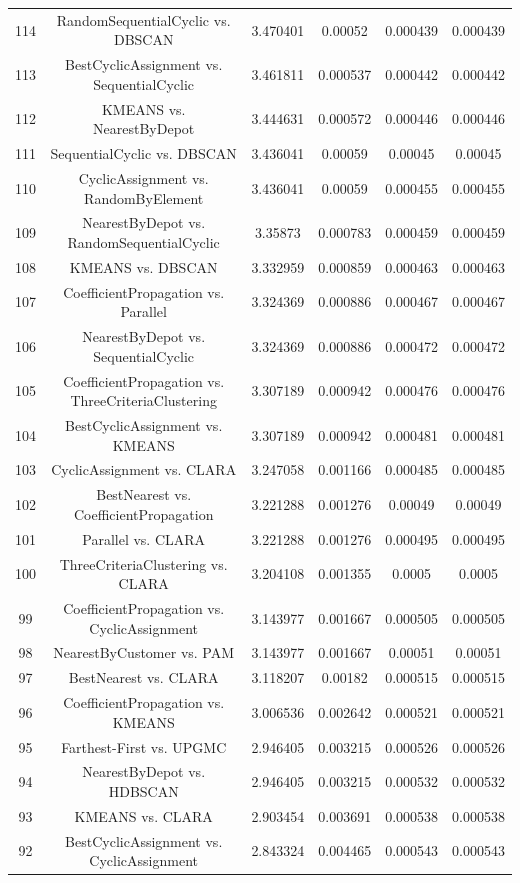 \documentclass[a4paper,10pt]{article}
\begin{document}
\begin{landscape}
\begin{table}[!htp]
\begin{tabular}{cccccc}
114&RandomSequentialCyclic vs. DBSCAN&3.470401&0.00052&0.000439&0.000439\\
113&BestCyclicAssignment vs. SequentialCyclic&3.461811&0.000537&0.000442&0.000442\\
112&KMEANS vs. NearestByDepot&3.444631&0.000572&0.000446&0.000446\\
111&SequentialCyclic vs. DBSCAN&3.436041&0.00059&0.00045&0.00045\\
110&CyclicAssignment vs. RandomByElement&3.436041&0.00059&0.000455&0.000455\\
109&NearestByDepot vs. RandomSequentialCyclic&3.35873&0.000783&0.000459&0.000459\\
108&KMEANS vs. DBSCAN&3.332959&0.000859&0.000463&0.000463\\
107&CoefficientPropagation vs. Parallel&3.324369&0.000886&0.000467&0.000467\\
106&NearestByDepot vs. SequentialCyclic&3.324369&0.000886&0.000472&0.000472\\
105&CoefficientPropagation vs. ThreeCriteriaClustering&3.307189&0.000942&0.000476&0.000476\\
104&BestCyclicAssignment vs. KMEANS&3.307189&0.000942&0.000481&0.000481\\
103&CyclicAssignment vs. CLARA&3.247058&0.001166&0.000485&0.000485\\
102&BestNearest vs. CoefficientPropagation&3.221288&0.001276&0.00049&0.00049\\
101&Parallel vs. CLARA&3.221288&0.001276&0.000495&0.000495\\
100&ThreeCriteriaClustering vs. CLARA&3.204108&0.001355&0.0005&0.0005\\
99&CoefficientPropagation vs. CyclicAssignment&3.143977&0.001667&0.000505&0.000505\\
98&NearestByCustomer vs. PAM&3.143977&0.001667&0.00051&0.00051\\
97&BestNearest vs. CLARA&3.118207&0.00182&0.000515&0.000515\\
96&CoefficientPropagation vs. KMEANS&3.006536&0.002642&0.000521&0.000521\\
95&Farthest-First vs. UPGMC&2.946405&0.003215&0.000526&0.000526\\
94&NearestByDepot vs. HDBSCAN&2.946405&0.003215&0.000532&0.000532\\
93&KMEANS vs. CLARA&2.903454&0.003691&0.000538&0.000538\\
92&BestCyclicAssignment vs. CyclicAssignment&2.843324&0.004465&0.000543&0.000543\\

\end{tabular}
\end{table}
\end{landscape}
\end{document}
